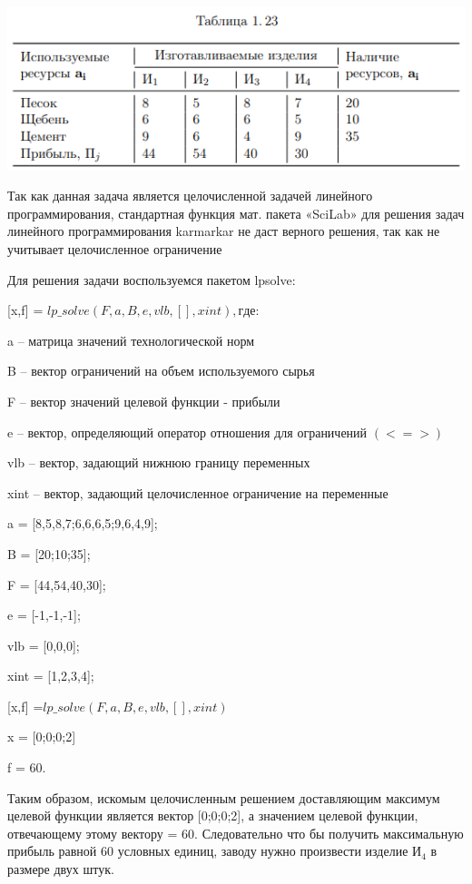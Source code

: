 \documentclass[russian,utf8,nocolumnxxxi,nocolumnxxxii]{eskdtext}
\begin{document}
{\begin{center}
\includegraphics[scale=0.7]{2019-01-09_01-47-19}
\end{center}
Так как данная задача является целочисленной задачей линейного программирования, стандартная функция мат. пакета «SciLab» для решения задач линейного программирования karmarkar не даст верного решения, так как не учитывает целочисленное ограничение
\newpage
\par
\normalsize
Для решения задачи воспользуемся пакетом lpsolve:

[x,f] =  $lp\_solve(F,a,B,e,vlb,[],xint), где:$

a – матрица значений технологической норм

B – вектор ограничений на объем используемого сырья

F – вектор значений целевой функции - прибыли

e – вектор, определяющий оператор отношения для ограничений $(<  =  >)$

vlb – вектор, задающий нижнюю границу переменных

xint – вектор, задающий целочисленное ограничение на переменные


a = [8,5,8,7;6,6,6,5;9,6,4,9];

B = [20;10;35];

F = [44,54,40,30];

e = [-1,-1,-1];

vlb = [0,0,0];

xint = [1,2,3,4];

[x,f] =$lp\_solve(F,a,B,e,vlb,[],xint)$

x = [0;0;0;2]

f = 60.

Таким образом, искомым целочисленным решением доставляющим максимум целевой функции является вектор [0;0;0;2], а значением целевой функции, отвечающему этому вектору = 60. Следовательно что бы получить максимальную прибыль равной 60 условных единиц, заводу нужно произвести изделие И$_4$ в размере двух штук.

}
\end{document}
